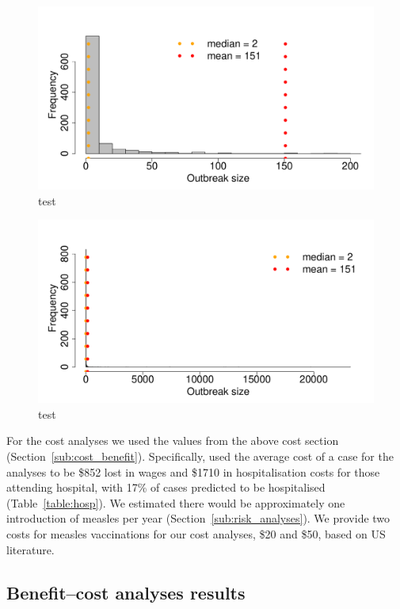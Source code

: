 \documentclass{article}
\begin{document}
\begin{figure}
     \centering
\includegraphics{interimreport2-036}
     \caption{test}
     \label{fig:sim}
\end{figure}

\begin{figure}
     \centering
\includegraphics{interimreport2-037}
     \caption{test}
     \label{fig:sim}
\end{figure}


For the cost analyses we used the values from the above cost section (Section~\ref{sub:cost_benefit}). Specifically, used the average cost of a case for the analyses to be \$852 lost in wages and \$1710 in hospitalisation costs for those attending hospital, with 17\% of cases predicted to be hospitalised (Table~\ref{table:hosp}). We estimated there would be approximately one introduction of measles per year (Section~\ref{sub:risk_analyses}). We provide two costs for measles vaccinations for our cost analyses, \$20 and \$50, based on US literature.

\subsection{Benefit--cost analyses results}
\end{document}
